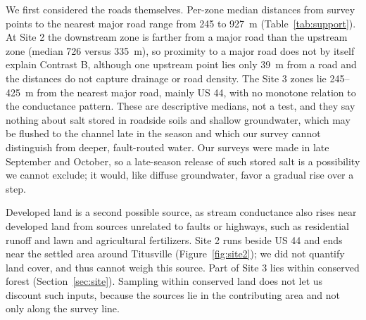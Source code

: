 \documentclass{article}
\begin{document}
We first considered the roads themselves. Per-zone median distances from survey points to the nearest major road range from 245 to 927~m (Table~\ref{tab:support}). At Site 2 the downstream zone is farther from a major road than the upstream zone (median 726 versus 335~m), so proximity to a major road does not by itself explain Contrast B, although one upstream point lies only 39~m from a road and the distances do not capture drainage or road density. The Site 3 zones lie 245--425~m from the nearest major road, mainly US 44, with no monotone relation to the conductance pattern. These are descriptive medians, not a test, and they say nothing about salt stored in roadside soils and shallow groundwater, which may be flushed to the channel late in the season and which our survey cannot distinguish from deeper, fault-routed water. Our surveys were made in late September and October, so a late-season release of such stored salt is a possibility we cannot exclude; it would, like diffuse groundwater, favor a gradual rise over a step.

Developed land is a second possible source, as stream conductance also rises near developed land from sources unrelated to faults or highways, such as residential runoff and lawn and agricultural fertilizers. Site 2 runs beside US 44 and ends near the settled area around Titusville (Figure~\ref{fig:site2}); we did not quantify land cover, and thus cannot weigh this source. Part of Site 3 lies within conserved forest (Section~\ref{sec:site}). Sampling within conserved land does not let us discount such inputs, because the sources lie in the contributing area and not only along the survey line.
\end{document}
